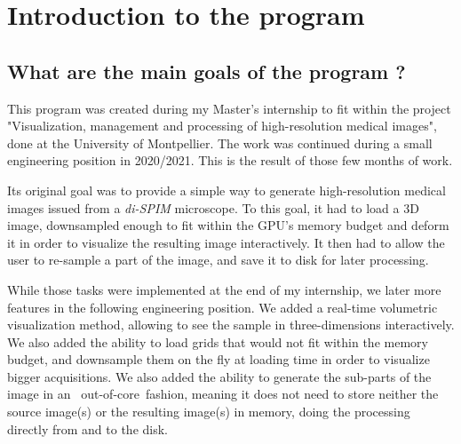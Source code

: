 \chapter{Introduction to the program}\label{text:01_intro}

\begin{comment}
	This section will include :
		- Why this program was created
		- What problems does it tackle / what are its features (very quickly)
		- How to read this manual ?
		- A few definitions
			- notably, the use of certain terms (dataset = 1/multiple 3D image(s))
\end{comment}

\section{What are the main goals of the program ?}\label{text:01_intro:01_goals}
{

	This program was created during my Master's internship to fit within the project "Visualization, management and processing of high-resolution medical images", done at the University of Montpellier. The work was continued during a small engineering position in 2020/2021. This is the result of those few months of work.

	Its original goal was to provide a simple way to generate high-resolution medical images issued from a \textit{di-SPIM} microscope. To this goal, it had to load a 3D image, downsampled enough to fit within the GPU's memory budget and deform it in order to visualize the resulting image interactively. It then had to allow the user to re-sample a part of the image, and save it to disk for later processing.

	While those tasks were implemented at the end of my internship, we later more features in the following engineering position. We added a real-time volumetric visualization method, allowing to see the sample in three-dimensions interactively. We also added the ability to load grids that would not fit within the memory budget, and downsample them on the fly at loading time in order to visualize bigger acquisitions. We also added the ability to generate the sub-parts of the image in an \guillemotleft~out-of-core~\guillemotright fashion, meaning it does not need to store neither the source image(s) or the resulting image(s) in memory, doing the processing directly from and to the disk.
}

